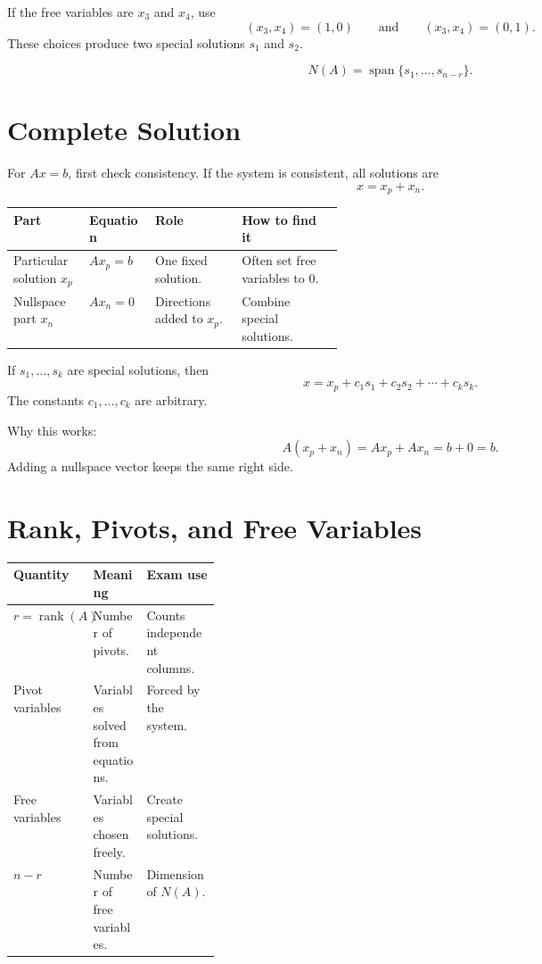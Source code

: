 \documentclass[10pt]{article}
\begin{document}
If the free variables are \(x_3\) and \(x_4\), use
\[
(x_3,x_4)=(1,0)
\qquad\text{and}\qquad
(x_3,x_4)=(0,1).
\]
These choices produce two special solutions \(s_1\) and \(s_2\).

\[
N(A)=\operatorname{span}\{s_1,\ldots,s_{n-r}\}.
\]


\section{Complete Solution}

For \(Ax=b\), first check consistency. If the system is consistent, all solutions are
\[
x=x_p+x_n.
\]

\begin{center}
\small
\begin{tabularx}{\linewidth}{@{}L{0.23\linewidth}L{0.20\linewidth}Y Y@{}}
\toprule
Part & Equation & Role & How to find it \\
\midrule
Particular solution \(x_p\) & \(Ax_p=b\) & One fixed solution. & Often set free variables to \(0\). \\
Nullspace part \(x_n\) & \(Ax_n=0\) & Directions added to \(x_p\). & Combine special solutions. \\
\bottomrule
\end{tabularx}
\end{center}

If \(s_1,\ldots,s_k\) are special solutions, then
\[
x=x_p+c_1s_1+c_2s_2+\cdots+c_ks_k.
\]
The constants \(c_1,\ldots,c_k\) are arbitrary.

Why this works:
\[
A(x_p+x_n)=Ax_p+Ax_n=b+0=b.
\]
Adding a nullspace vector keeps the same right side.


\section{Rank, Pivots, and Free Variables}

\begin{center}
\small
\begin{tabularx}{\linewidth}{@{}L{0.27\linewidth}Y Y@{}}
\toprule
Quantity & Meaning & Exam use \\
\midrule
\(r=\operatorname{rank}(A)\) & Number of pivots. & Counts independent columns. \\
Pivot variables & Variables solved from equations. & Forced by the system. \\
Free variables & Variables chosen freely. & Create special solutions. \\
\(n-r\) & Number of free variables. & Dimension of \(N(A)\). \\
\bottomrule
\end{tabularx}
\end{center}
\end{document}
